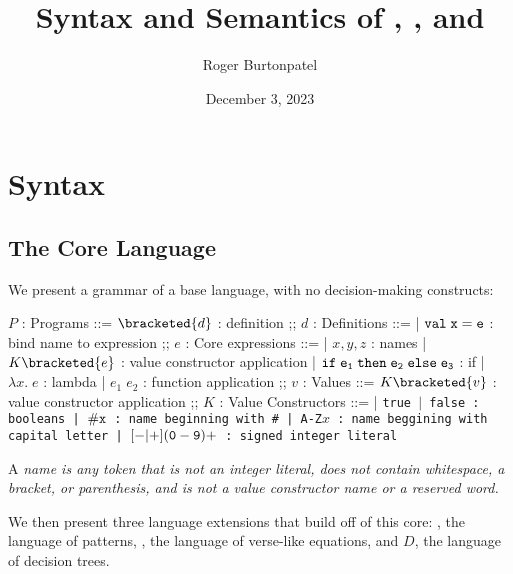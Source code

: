 \documentclass[]{article}
\title{Syntax and Semantics of \Vminus, \Pplus, and \D}
\author{Roger Burtonpatel}
\date{December 3, 2023}
\begin{document}
\maketitle

\section{Syntax}

\subsection{The Core Language}

We present a grammar of a base language, with no decision-making constructs: 

\bigskip

\begin{center}
    \begin{bnf}
    $P$ : \textsf{Programs} ::=
    $\bracketed{d}$ : definition
    ;;
    $d$ : \textsf{Definitions} ::=
    | $\tt{val} \; x \; \tt{=} \; e$ : bind name to expression
    ;;
    $e$ : Core expressions ::= 
    | $x, y, z$ : names
    | $K\bracketed{e}$ : value constructor application 
    | $\tt{if} \; e_{1} \; \tt{then} \; e_{2} \; \tt{else} \; e_{3} $ : if
    | $\lambda x. \; e$ : lambda 
    | $e_{1} \; e_{2}$ : function application 
    ;;
    $v$ : Values ::= $K\bracketed{v}$ : value constructor application 
    ;;
    $K$ : \textsf{Value Constructors} ::=
    | \tt{true} $\vert$ \tt{false} : booleans
    | $\tt{\#}x$ : name beginning with \tt{\#}
    | \tt{A-Z}$x$ : name beggining with capital letter
    | $[\tt{-}\vert\tt{+}](\tt{0}-\tt{9})+$ : signed integer literal 

    \end{bnf}
\end{center}


A \it{name} is any token that is not an integer literal, 
does not contain whitespace, a bracket, or parenthesis, 
and is not a value constructor name or a reserved word.


We then present three language extensions that build off of this core: 
\Pplus, the language of patterns, \Vminus, the language of 
verse-like equations, and $D$, the language of decision trees. 
\end{document}
